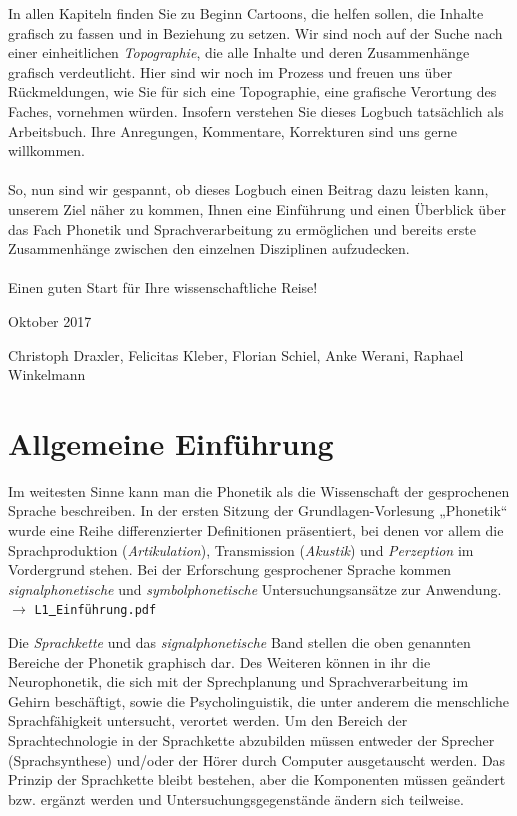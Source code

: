 \documentclass[11pt]{book}
\begin{document}
In allen Kapiteln finden Sie zu Beginn  Cartoons, die helfen sollen, die Inhalte grafisch zu fassen und in Beziehung zu setzen. Wir sind noch auf der Suche nach einer einheitlichen \textit{Topographie}, die alle Inhalte und deren Zusammenhänge grafisch verdeutlicht. Hier sind wir noch im Prozess und freuen uns über Rückmeldungen, wie Sie für sich eine Topographie, eine grafische Verortung des Faches, vornehmen würden. Insofern verstehen Sie dieses Logbuch tatsächlich als Arbeitsbuch. Ihre Anregungen, Kommentare, Korrekturen sind uns gerne willkommen.\\
\\
So, nun sind wir gespannt, ob dieses Logbuch einen Beitrag dazu leisten kann, unserem Ziel näher zu kommen, Ihnen eine Einführung und einen Überblick über das Fach Phonetik und Sprachverarbeitung zu ermöglichen und bereits erste Zusammenhänge zwischen den einzelnen Disziplinen aufzudecken.\\
\\
Einen guten Start für Ihre wissenschaftliche Reise!
\begin {flushright} 
Oktober 2017
\end{flushright}
Christoph Draxler, Felicitas Kleber, Florian Schiel, Anke Werani, Raphael Winkelmann





\chapter{Allgemeine Einführung}

Im weitesten Sinne kann man die Phonetik als die Wissenschaft der gesprochenen Sprache beschreiben. In der ersten Sitzung der Grundlagen-Vorlesung „Phonetik“ wurde eine Reihe differenzierter Definitionen präsentiert, bei denen vor allem die Sprachproduktion (\textit{Artikulation}), Transmission (\textit{Akustik}) und \textit{Perzeption} im Vordergrund stehen. Bei der Erforschung gesprochener Sprache kommen \textit{signalphonetische} und \textit{symbolphonetische} Untersuchungsansätze zur Anwendung. $\rightarrow$ {\tt L1\underline{\ }Einführung.pdf} 

Die \textit{Sprachkette} und das \textit{signalphonetische} Band stellen die oben genannten Bereiche der Phonetik graphisch dar. Des Weiteren können in ihr die Neurophonetik, die sich mit der Sprechplanung und Sprachverarbeitung im Gehirn beschäftigt, sowie die Psycholinguistik, die unter anderem die menschliche Sprachfähigkeit untersucht, verortet werden.  Um den Bereich der Sprachtechnologie in der Sprachkette abzubilden müssen entweder der Sprecher (Sprachsynthese) und/oder der Hörer durch Computer   ausgetauscht werden. Das Prinzip der Sprachkette bleibt bestehen, aber die Komponenten müssen geändert bzw. ergänzt werden und Untersuchungsgegenstände ändern sich teilweise.
\end{document}
